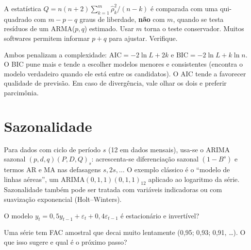 \begin{atencao}
A estatística $Q=n(n+2)\sum_{k=1}^m\hat\rho_k^2/(n-k)$ é comparada com uma qui-quadrado com $m-p-q$ graus de liberdade, \textbf{não} com $m$, quando se testa resíduos de um ARMA($p,q$) estimado. Usar $m$ torna o teste conservador. Muitos softwares permitem informar $p+q$ para ajustar. Verifique.
\end{atencao}

\begin{intuicao}
Ambos penalizam a complexidade: $\text{AIC}=-2\ln L+2k$ e $\text{BIC}=-2\ln L+k\ln n$. O BIC pune mais e tende a escolher modelos menores e consistentes (encontra o modelo verdadeiro quando ele está entre os candidatos). O AIC tende a favorecer qualidade de previsão. Em caso de divergência, vale olhar os dois e preferir parcimônia.
\end{intuicao}

\section{Sazonalidade}
Para dados com ciclo de período $s$ (12 em dados mensais), usa-se o ARIMA sazonal $(p,d,q)(P,D,Q)_s$: acrescenta-se diferenciação sazonal $(1-B^s)$ e termos AR e MA nas defasagens $s,2s,\dots$ O exemplo clássico é o ``modelo de linhas aéreas'', um ARIMA$(0,1,1)(0,1,1)_{12}$ aplicado ao logaritmo da série. Sazonalidade também pode ser tratada com variáveis indicadoras ou com suavização exponencial (Holt--Winters).

\begin{exercicio}
O modelo $y_t=0{,}5y_{t-1}+\varepsilon_t+0{,}4\varepsilon_{t-1}$ é estacionário e invertível?
\end{exercicio}

\begin{exercicio}
Uma série tem FAC amostral que decai muito lentamente (0,95; 0,93; 0,91, \dots). O que isso sugere e qual é o próximo passo?
\end{exercicio}
